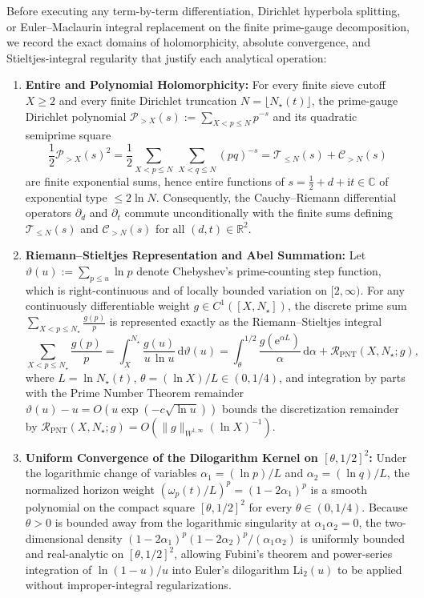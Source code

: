 \documentclass[11pt,reqno]{amsart}
\theoremstyle{definition}
\theoremstyle{remark}
\numberwithin{equation}{section}
\newcommand{\dd}{\mathrm{d}}
\newcommand{\ii}{\mathrm{i}}
\newcommand{\ee}{\mathrm{e}}
\newcommand{\Li}{\mathrm{Li}}
\begin{document}
Before executing any term-by-term differentiation, Dirichlet hyperbola splitting, or Euler--Maclaurin integral replacement on the finite prime-gauge decomposition, we record the exact domains of holomorphicity, absolute convergence, and Stieltjes-integral regularity that justify each analytical operation:
\begin{enumerate}[label=\upshape(\arabic*),leftmargin=2.2em]
\item \textbf{Entire and Polynomial Holomorphicity:} For every finite sieve cutoff $X \ge 2$ and every finite Dirichlet truncation $N = \lfloor N_\star(t) \rfloor$, the prime-gauge Dirichlet polynomial $\mathcal{P}_{>X}(s) := \sum_{X < p \le N} p^{-s}$ and its quadratic semiprime square
\begin{equation}\label{eq:P-square-def}
\frac{1}{2}\mathcal{P}_{>X}(s)^2 = \frac{1}{2}\sum_{X < p \le N}\,\sum_{X < q \le N} (pq)^{-s} = \mathcal{T}_{\le N}(s) + \mathcal{C}_{>N}(s)
\end{equation}
are finite exponential sums, hence entire functions of $s = \frac{1}{2} + d + \ii t \in \mathbb{C}$ of exponential type $\le 2\ln N$. Consequently, the Cauchy--Riemann differential operators $\partial_d$ and $\partial_t$ commute unconditionally with the finite sums defining $\mathcal{T}_{\le N}(s)$ and $\mathcal{C}_{>N}(s)$ for all $(d,t) \in \mathbb{R}^2$.
\item \textbf{Riemann--Stieltjes Representation and Abel Summation:} Let $\vartheta(u) := \sum_{p \le u} \ln p$ denote Chebyshev's prime-counting step function, which is right-continuous and of locally bounded variation on $[2,\infty)$. For any continuously differentiable weight $g \in C^1([X,N_\star])$, the discrete prime sum $\sum_{X < p \le N_\star} \frac{g(p)}{p}$ is represented exactly as the Riemann--Stieltjes integral
\begin{equation}\label{eq:stieltjes-rep}
\sum_{X < p \le N_\star} \frac{g(p)}{p} = \int_{X}^{N_\star} \frac{g(u)}{u\,\ln u}\,\dd\vartheta(u) = \int_{\theta}^{1/2} \frac{g(\ee^{\alpha L})}{\alpha}\,\dd\alpha + \mathcal{R}_{\mathrm{PNT}}(X,N_\star;g),
\end{equation}
where $L = \ln N_\star(t)$, $\theta = (\ln X)/L \in (0,1/4)$, and integration by parts with the Prime Number Theorem remainder $\vartheta(u) - u = O(u\exp(-c\sqrt{\ln u}))$ \cite{MontgomeryVaughan2007,Titchmarsh1986} bounds the discretization remainder by $\mathcal{R}_{\mathrm{PNT}}(X,N_\star;g) = O(\|g\|_{W^{1,\infty}}(\ln X)^{-1})$.
\item \textbf{Uniform Convergence of the Dilogarithm Kernel on $[\theta,1/2]^2$:} Under the logarithmic change of variables $\alpha_1 = (\ln p)/L$ and $\alpha_2 = (\ln q)/L$, the normalized horizon weight $(\omega_p(t)/L)^p = (1 - 2\alpha_1)^p$ is a smooth polynomial on the compact square $[\theta,1/2]^2$ for every $\theta \in (0,1/4)$. Because $\theta > 0$ is bounded away from the logarithmic singularity at $\alpha_1\alpha_2 = 0$, the two-dimensional density $(1-2\alpha_1)^p(1-2\alpha_2)^p/(\alpha_1\alpha_2)$ is uniformly bounded and real-analytic on $[\theta,1/2]^2$, allowing Fubini's theorem and power-series integration of $\ln(1-u)/u$ into Euler's dilogarithm $\Li_2(u)$ to be applied without improper-integral regularizations.
\end{enumerate}
\end{document}
